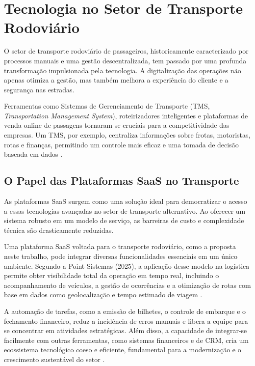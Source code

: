 \section{Tecnologia no Setor de Transporte Rodoviário}

O setor de transporte rodoviário de passageiros, historicamente caracterizado por processos manuais e uma gestão descentralizada, tem passado por uma profunda transformação impulsionada pela tecnologia. A digitalização das operações não apenas otimiza a gestão, mas também melhora a experiência do cliente e a segurança nas estradas.

Ferramentas como Sistemas de Gerenciamento de Transporte (TMS, \textit{Transportation Management System}), roteirizadores inteligentes e plataformas de venda online de passagens tornaram-se cruciais para a competitividade das empresas. Um TMS, por exemplo, centraliza informações sobre frotas, motoristas, rotas e finanças, permitindo um controle mais eficaz e uma tomada de decisão baseada em dados \cite{praxio2023tecnologia}.

\subsection{O Papel das Plataformas SaaS no Transporte}

As plataformas SaaS surgem como uma solução ideal para democratizar o acesso a essas tecnologias avançadas no setor de transporte alternativo. Ao oferecer um sistema robusto em um modelo de serviço, as barreiras de custo e complexidade técnica são drasticamente reduzidas.

Uma plataforma SaaS voltada para o transporte rodoviário, como a proposta neste trabalho, pode integrar diversas funcionalidades essenciais em um único ambiente. Segundo a Point Sistemas (2025), a aplicação desse modelo na logística permite obter visibilidade total da operação em tempo real, incluindo o acompanhamento de veículos, a gestão de ocorrências e a otimização de rotas com base em dados como geolocalização e tempo estimado de viagem \cite{pointsistemas2025logistica}.

A automação de tarefas, como a emissão de bilhetes, o controle de embarque e o fechamento financeiro, reduz a incidência de erros manuais e libera a equipe para se concentrar em atividades estratégicas. Além disso, a capacidade de integrar-se facilmente com outras ferramentas, como sistemas financeiros e de CRM, cria um ecossistema tecnológico coeso e eficiente, fundamental para a modernização e o crescimento sustentável do setor \cite{gestran2025saas}.